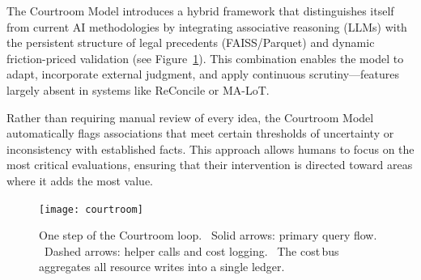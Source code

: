 \documentclass[11pt]{article}
\begin{document}
The Courtroom Model introduces a hybrid framework that distinguishes itself from current AI methodologies by integrating associative reasoning (LLMs) with the persistent structure of legal precedents (FAISS/Parquet) and dynamic friction-priced validation (see Figure~\ref{fig:courtroom}).
This combination enables the model to adapt, incorporate external judgment, and apply continuous scrutiny—features largely absent in systems like ReConcile or MA-LoT.

Rather than requiring manual review of every idea, the Courtroom Model automatically flags associations that meet certain thresholds of uncertainty or inconsistency with established facts. This approach allows humans to focus on the most critical evaluations, ensuring that their intervention is directed toward areas where it adds the most value.

\begin{figure}[H]
  \centering
  \texttt{[image: courtroom]}%
  \caption{One step of the Courtroom loop.%
           \ Solid arrows: primary query flow.%
           \ Dashed arrows: helper calls and cost logging.%
           \ The cost\,bus aggregates all resource writes into a single ledger.}
  \label{fig:courtroom}
\end{figure}
\end{document}
